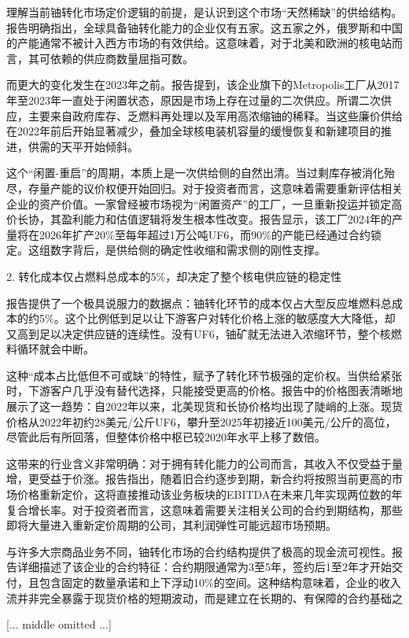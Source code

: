 \documentclass[11pt]{ctexart}
\begin{document}
理解当前铀转化市场定价逻辑的前提，是认识到这个市场“天然稀缺”的供给结构。报告明确指出，全球具备铀转化能力的企业仅有五家。这五家之外，俄罗斯和中国的产能通常不被计入西方市场的有效供给。这意味着，对于北美和欧洲的核电站而言，其可依赖的供应商数量屈指可数。

而更大的变化发生在2023年之前。报告提到，该企业旗下的Metropolis工厂从2017年至2023年一直处于闲置状态，原因是市场上存在过量的二次供应。所谓二次供应，主要来自政府库存、乏燃料再处理以及军用高浓缩铀的稀释。当这些廉价供给在2022年前后开始显著减少，叠加全球核电装机容量的缓慢恢复和新建项目的推进，供需的天平开始倾斜。

这个“闲置-重启”的周期，本质上是一次供给侧的自然出清。当过剩库存被消化殆尽，存量产能的议价权便开始回归。对于投资者而言，这意味着需要重新评估相关企业的资产价值。一家曾经被市场视为“闲置资产”的工厂，一旦重新投运并锁定高价长协，其盈利能力和估值逻辑将发生根本性改变。报告显示，该工厂2024年的产量将在2026年扩产20\%至每年超过1万公吨UF6，而90\%的产能已经通过合约锁定。这组数字背后，是供给侧的确定性收缩和需求侧的刚性支撑。

2. 转化成本仅占燃料总成本的5\%，却决定了整个核电供应链的稳定性

报告提供了一个极具说服力的数据点：铀转化环节的成本仅占大型反应堆燃料总成本的约5\%。这个比例低到足以让下游客户对转化价格上涨的敏感度大大降低，却又高到足以决定供应链的连续性。没有UF6，铀矿就无法进入浓缩环节，整个核燃料循环就会中断。

这种“成本占比低但不可或缺”的特性，赋予了转化环节极强的定价权。当供给紧张时，下游客户几乎没有替代选择，只能接受更高的价格。报告中的价格图表清晰地展示了这一趋势：自2022年以来，北美现货和长协价格均出现了陡峭的上涨。现货价格从2022年初约28美元/公斤UF6，攀升至2025年初接近100美元/公斤的高位，尽管此后有所回落，但整体价格中枢已较2020年水平上移了数倍。

这带来的行业含义非常明确：对于拥有转化能力的公司而言，其收入不仅受益于量增，更受益于价涨。报告指出，随着旧合约逐步到期，新合约将按照当前更高的市场价格重新定价，这将直接推动该业务板块的EBITDA在未来几年实现两位数的年复合增长率。对于投资者而言，这意味着需要关注相关公司的合约到期结构，那些即将大量进入重新定价周期的公司，其利润弹性可能远超市场预期。

与许多大宗商品业务不同，铀转化市场的合约结构提供了极高的现金流可视性。报告详细描述了该企业的合约特征：合约期限通常为3至5年，签约后1至2年才开始交付，且包含固定的数量承诺和上下浮动10\%的空间。这种结构意味着，企业的收入流并非完全暴露于现货价格的短期波动，而是建立在长期的、有保障的合约基础之

[... middle omitted ...]
\end{document}
